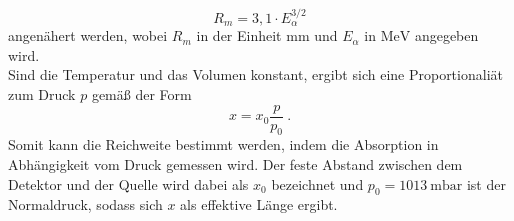 \begin{equation}
  R_m = 3,1 \cdot E_{\alpha}^{3/2}
  \label{eqn:kleine}
\end{equation}
angenähert werden, wobei $R_m$ in der Einheit $\si{\milli\meter}$ und $E_{\alpha}$
in $\si{\mega\electronvolt}$ angegeben wird.\\
Sind die Temperatur und das Volumen konstant, ergibt sich eine Proportionaliät
zum Druck $p$ gemäß der Form
\begin{equation}
  x = x_0 \frac{p}{p_0} \:.
  \label{eqn:compare_rho_temp}
\end{equation}
Somit kann die Reichweite bestimmt werden, indem die Absorption in Abhängigkeit vom
Druck gemessen wird. Der feste Abstand zwischen dem Detektor und der Quelle wird dabei als
$x_0$ bezeichnet und $p_0=\SI{1013}{\milli\bar}$ ist der Normaldruck, sodass sich $x$ als effektive
Länge ergibt.
